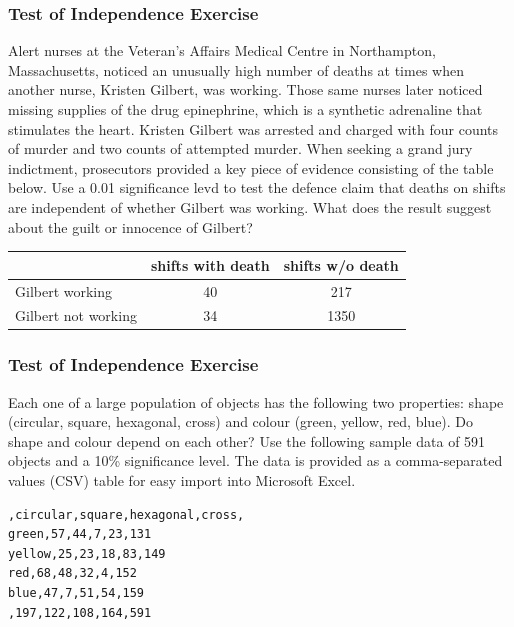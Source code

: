 \documentclass[xcolor=dvipsnames]{beamer}
\begin{document}
\begin{frame}
  \frametitle{Test of Independence Exercise}
  {\ubung} Alert nurses at the Veteran's Affairs Medical Centre in
  Northampton, Massachusetts, noticed an unusually high number of
  deaths at times when another nurse, Kristen Gilbert, was working.
  Those same nurses later noticed missing supplies of the drug
  epinephrine, which is a synthetic adrenaline that stimulates the
  heart. Kristen Gilbert was arrested and charged with four counts of
  murder and two counts of attempted murder. When seeking a grand jury
  indictment, prosecutors provided a key piece of evidence consisting
  of the table below. Use a 0.01 significance levd to test the
  defence claim that deaths on shifts are independent of whether
  Gilbert was working. What does the result suggest about the guilt or
  innocence of Gilbert?

  \bigskip

  \begin{tabular}{|l|c|c|}\hline
                    & shifts with death & shifts w/o death \\ \hline
Gilbert working     & 40                & 217              \\ \hline
Gilbert not working & 34                & 1350             \\ \hline
  \end{tabular}
\end{frame}

\begin{frame}[fragile]
  \frametitle{Test of Independence Exercise}
  {\ubung} Each one of a large population of objects has the following two
  properties: shape (circular, square, hexagonal, cross) and colour
  (green, yellow, red, blue). Do shape and colour depend on each
  other? Use the following sample data of 591 objects and a 10\%
  significance level. The data is provided as a comma-separated values
  (CSV) table for easy import into Microsoft Excel.
\begin{verbatim}
,circular,square,hexagonal,cross,
green,57,44,7,23,131
yellow,25,23,18,83,149
red,68,48,32,4,152
blue,47,7,51,54,159
,197,122,108,164,591
\end{verbatim}
\end{frame}

\end{document}
